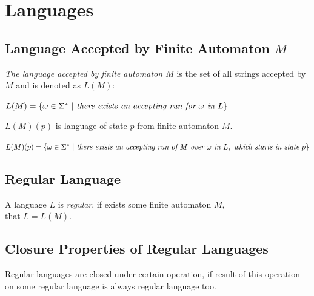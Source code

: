\section{Languages}
		\subsection{Language Accepted by Finite Automaton $M$}
		\label{defLangM}
		\begin{definition}
			\emph{The language accepted by finite automaton $M$} is the set of all strings accepted by $M$ and is denoted as $L(M)$:
			\begin{description}
				\item $L(M) = \{\omega\in\Sigma^{*}\ |\ \emph{there exists an accepting run for }\omega\emph{ in }L\}$
			\end{description}
		\end{definition}
		\begin{definition}
			$L(M)(p)$ is language of state $p$ from finite automaton $M$.
			\begin{description}
				\item $L(M)(p) = \{\omega\in\Sigma^{*}\ |\ \emph{there exists an accepting run of }M\emph{ over }\omega\emph{ in }L,\emph{ which starts in state }p\}$
			\end{description}
		\end{definition}
		\subsection{Regular Language}
		\begin{definition}
			A language $L$ is \emph{regular}, if exists some finite automaton $M$,\\ that $L=L(M)$.
		\end{definition}

		\subsection{Closure Properties of Regular Languages}
		\label{defClose}
		Regular languages are closed under certain operation, if result of this operation on some regular language is always regular language too.


